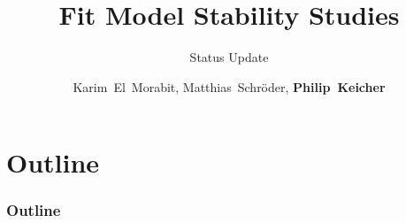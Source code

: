 \documentclass[18pt]{beamer}
\title[\ttbarH Analysis Study]{\ttbarH Fit Model Stability Studies}
\subtitle{Status Update}
\author[Philip Keicher]{Karim~El~Morabit, Matthias~Schröder, \textbf{Philip~Keicher}}
\institute{Institut für Experimentelle Teilchenphysik (ETP)}
\begin{document}


\begin{frame}
\titlepage
\end{frame}
\setcounter{tocdepth}{2}
\section*{Outline}
\begin{frame}[label={outline}]
	\frametitle{Outline}
	\tableofcontents
\end{frame}




%




\beginbackup




\backupend
\end{document}
